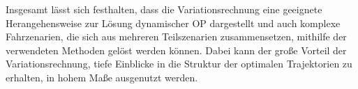 Insgesamt lässt sich festhalten, dass die Variationsrechnung eine geeignete Herangehensweise zur Lösung dynamischer \gls{OP} dargestellt und auch komplexe Fahrzenarien, die sich aus mehreren Teilszenarien zusammensetzen, mithilfe der verwendeten Methoden gelöst werden können. Dabei kann der große Vorteil der Variationsrechnung, tiefe Einblicke in die Struktur der optimalen Trajektorien zu erhalten, in hohem Maße ausgenutzt werden. 
